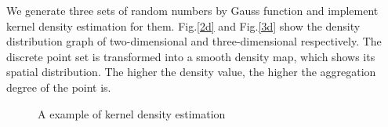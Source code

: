 \documentclass[11pt]{report}
\begin{document}
	\noindent We generate three sets of random numbers by Gauss function and implement kernel density estimation for them. Fig.\ref{2d} and Fig.\ref{3d} show the density distribution graph of two-dimensional and three-dimensional respectively. The discrete point set is transformed into a smooth density map, which shows its spatial distribution. The higher the density value, the higher the aggregation degree of the point is.\\
	\begin{figure}[!h]
		\centering
		\caption{A example of kernel density estimation}
		\label{}
	\end{figure}
\end{document}
